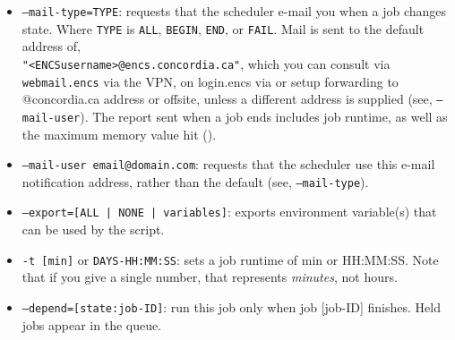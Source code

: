 \begin{itemize}
\item
\texttt{--mail-type=TYPE}: requests that the scheduler e-mail you when a job changes
state. Where \texttt{TYPE} is \texttt{ALL}, \texttt{BEGIN}, \texttt{END}, or \texttt{FAIL}.
Mail is sent to the default address of, \\
\texttt{"<ENCSusername>@encs.concordia.ca"}, which you can consult
via \texttt{webmail.encs} via the VPN, on login.encs via 
or setup forwarding to @concordia.ca address or offsite,
unless a different address is supplied (see, \texttt{--mail-user}).
The report sent when a job ends includes job 
runtime, as well as the maximum memory value hit (). 

\item
\texttt{--mail-user email@domain.com}: requests that the scheduler use this e-mail 
notification address, rather than the default (see, \texttt{--mail-type}). 

\item
\texttt{--export=[ALL | NONE | variables]}: exports environment variable(s) that can be used by the script.

\item
\texttt{-t [min]} or \texttt{DAYS-HH:MM:SS}: sets a job runtime of min or HH:MM:SS. Note 
that if you give a single number, that represents \emph{minutes}, not hours. 

\item
\texttt{--depend=[state:job-ID]}: run this job only when job [job-ID] finishes. Held jobs appear in the queue. 

\end{itemize}

